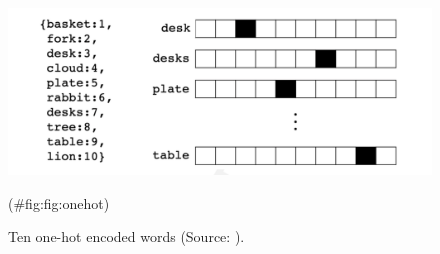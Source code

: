 \documentclass[
]{krantz}
\begin{document}
\begin{figure}

{\centering \includegraphics[width=0.7\linewidth]{./figures/01-01-nlp/onehot_pilehvar_p10} 

}

\caption{Ten one-hot encoded words (Source: \citet{Pilehvar2021}).}(\#fig:fig:onehot)
\end{figure}
\end{document}

